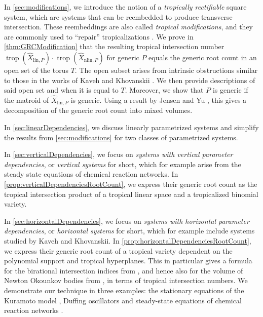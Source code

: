 \documentclass[12pt,reqno,a4paper]{amsart}
\theoremstyle{theoremstyle}
\theoremstyle{examplestyle}
\theoremstyle{algorithmstyle}
\newcommand{\lin}{{\mathrm{lin}}}
\newcommand{\nlin}{{\mathrm{nlin}}}
\DeclareMathOperator{\trop}{trop}
\begin{document}
In \cref{sec:modifications}, we introduce the notion of a \emph{tropically rectifiable} square system, which are systems that can be reembedded to produce transverse intersection.   These reembeddings are also called \emph{tropical modifications}, and they are commonly used to ``repair'' tropicalizations \cite{CuetoMarkwig2016}.  We prove in \cref{thm:GRCModification} that the resulting tropical intersection number $\trop(\hat X_{\lin,P})\cdot \trop(\hat X_{\nlin,P})$ for generic $P$ equals the generic root count in an open set of the torus $T$.  The open subset arises from intrinsic obstructions similar to those in the works of Kaveh and Khovanskii \cite{KavehKhovanskii2010,KavehKhovanskii2012}.  We then provide descriptions of said open set and when it is equal to $T$. Moreover, we show that $P$ is generic if the matroid of $\hat X_{\lin,P}$ is generic.  Using a result by Jensen and Yu \cite[Corollary 5.2]{AndersJosephine2016}, this gives a decomposition of the generic root count into mixed volumes.

In \cref{sec:linearDependencies}, we discuss linearly parametrized systems and simplify the results from \cref{sec:modifications} for two classes of parametrized systems.

In \cref{sec:verticalDependencies}, we focus on \emph{systems with vertical parameter dependencies}, or \emph{vertical systems} for short, which for example arise from the steady state equations of chemical reaction networks. In \cref{prop:verticalDependenciesRootCount}, we express their generic root count as the tropical intersection product of a tropical linear space and a tropicalized binomial variety.

In \cref{sec:horizontalDependencies}, we focus on \emph{systems with horizontal parameter dependencies}, or \emph{horizontal systems} for short, which for example include systems studied by Kaveh and Khovanskii. In \cref{prop:horizontalDependenciesRootCount}, we express their generic root count of a tropical variety dependent on the polynomial support and tropical hyperplanes.  This in particular gives a formula for the birational intersection indices from \cite{KavehKhovanskii2010}, and hence also for the volume of Newton Okounkov bodies from \cite{KavehKhovanskii2012}, in terms of tropical intersection numbers.  We demonstrate our technique in three examples:  the stationary equations of the Kuramoto model \cite{Kuramoto2019}, Duffing oscillators \cite{BMMT2022} and steady-state equations of chemical reaction networks \cite{Dickenstein16}.
\end{document}
